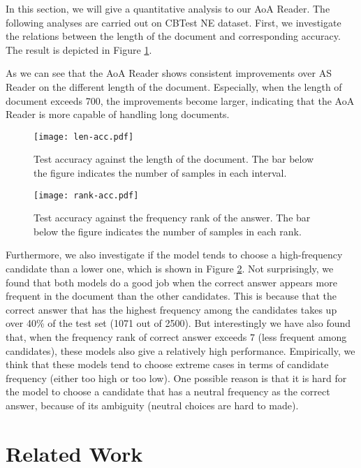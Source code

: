 \documentclass[11pt,a4paper]{article}
\begin{document}
In this section, we will give a quantitative analysis to our AoA Reader. The following analyses are carried out on CBTest NE dataset.
First, we investigate the relations between the length of the document and corresponding accuracy. The result is depicted in Figure \ref{length-acc}. 

As we can see that the AoA Reader shows consistent improvements over AS Reader on the different length of the document.
Especially, when the length of document exceeds 700, the improvements become larger, indicating that the AoA Reader is more capable of handling long documents.

\begin{figure}[ht]
  \centering
  \texttt{[image: len-acc.pdf]}
  \caption{\label{length-acc} Test accuracy against the length of the document. The bar below the figure indicates the number of samples in each interval.}
\end{figure}

\begin{figure}[ht]
  \centering
  \texttt{[image: rank-acc.pdf]}
  \caption{\label{rank-acc} Test accuracy against the frequency rank of the answer. The bar below the figure indicates the number of samples in each rank.}
\end{figure}

Furthermore, we also investigate if the model tends to choose a high-frequency candidate than a lower one, which is shown in Figure \ref{rank-acc}. 
Not surprisingly, we found that both models do a good job when the correct answer appears more frequent in the document than the other candidates.
This is because that the correct answer that has the highest frequency among the candidates takes up over 40\% of the test set (1071 out of 2500).
But interestingly we have also found that, when the frequency rank of correct answer exceeds 7 (less frequent among candidates), these models also give a relatively high performance.
Empirically, we think that these models tend to choose extreme cases in terms of candidate frequency (either too high or too low).
One possible reason is that it is hard for the model to choose a candidate that has a neutral frequency as the correct answer, because of its ambiguity (neutral choices are hard to made). 


\section{Related Work}\label{related-work}
\end{document}
